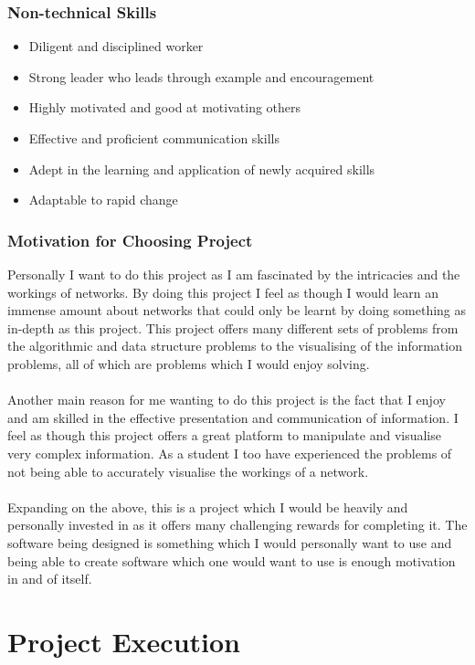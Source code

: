 \documentclass{article}
\begin{document}
\subsubsection{Non-technical Skills}
\begin{itemize}
	\item Diligent and disciplined worker
	\item Strong leader who leads through example and encouragement
	\item Highly motivated and good at motivating others
	\item Effective and proficient communication skills
	\item Adept in the learning and application of newly acquired skills
	\item Adaptable to rapid change
\end{itemize}
\subsubsection{Motivation for Choosing Project}
Personally I want to do this project as I am fascinated by the intricacies and the workings of networks. By doing this project I feel as though I would learn an immense amount about networks that could only be learnt by doing something as in-depth as this project. This project offers many different sets of problems from the algorithmic and data structure problems to the visualising of the information problems, all of which are problems which I would enjoy solving.
\\\\		
Another main reason for me wanting to do this project is the fact that I enjoy and am skilled in the effective presentation and communication of information. I feel as though this project offers a great platform to manipulate and visualise very complex information. As a student I too have experienced the problems of not being able to accurately visualise the workings of a network.
\\\\		
Expanding on the above, this is a project which I would be heavily and personally invested in as it offers many challenging rewards for completing it. The software being designed is something which I would personally want to use and being able to create software which one would want to use is enough motivation in and of itself.

\cleardoublepage
    
\section{Project Execution}
\end{document}
